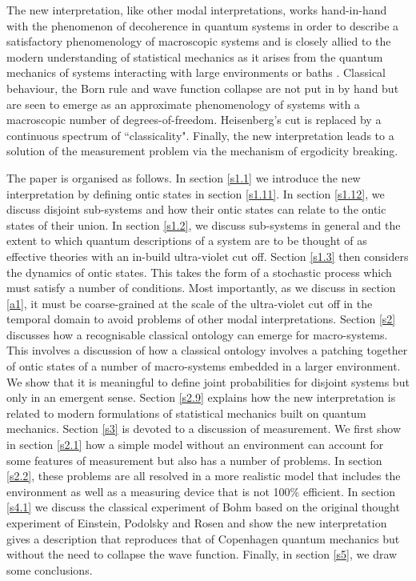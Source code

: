 \documentclass[%
preprint,
nofootinbib,
 amsmath,amssymb,
aps,
]{revtex4-1}
\begin{document}
The new interpretation, like other modal interpretations, works hand-in-hand with the phenomenon of decoherence in quantum systems \cite{Bohm:1951qt,JoosZeh:1985ecptiwe,Joos:2003dacwqt,Zurek:2003dtqc,Schlosshauer:2005dmpiqm,SchlosshauerCamilleri:2008qct,BreuerPetruccione:2002toqs} in order to describe a satisfactory phenomenology of macroscopic systems and is closely allied to the modern understanding of statistical mechanics as it arises from the quantum mechanics of systems interacting with large environments or baths \cite{PopescuShortWinter:2005fsmeisa,PopescuShortWinter:2006efsm,BL,LL,GoldsteinLebowitzTumulkaZanghi:2006ct,GMM,LPSW,Sh}. Classical behaviour, the Born rule and wave function collapse are not put in by hand but are seen to emerge as an approximate phenomenology of systems with a macroscopic number of degrees-of-freedom. Heisenberg's cut is replaced by a continuous spectrum of ``classicality".
Finally, the new interpretation  leads to a solution of the measurement problem via the mechanism of ergodicity breaking.

The paper is organised as follows. In section \ref{s1.1} we introduce the new interpretation by defining ontic states in section \ref{s1.11}. In section \ref{s1.12}, we discuss disjoint sub-systems and how their ontic states can relate to the ontic states of their union. In section \ref{s1.2}, we discuss sub-systems in general and the extent to which quantum descriptions of a system are to be thought of as effective theories with an in-build ultra-violet cut off. Section \ref{s1.3} then considers the dynamics of ontic states. This takes the form of a stochastic process which must satisfy a number of conditions. Most importantly, as we discuss in section \ref{a1}, it must be coarse-grained at the scale of the ultra-violet cut off in the temporal domain to avoid problems of other modal interpretations. Section \ref{s2} discusses how a recognisable classical ontology can emerge for macro-systems. This involves a discussion of how a classical ontology involves a patching together of ontic states of a number of macro-systems embedded in a larger environment. We show that it is meaningful to define joint probabilities for disjoint systems but only in an emergent sense. Section \ref{s2.9} explains how the new interpretation is related to modern formulations of statistical mechanics built on quantum mechanics. Section \ref{s3} is devoted to a discussion of measurement. We first show in section \ref{s2.1} how a simple model without an environment can account for some features of measurement but also has a number of problems. In section \ref{s2.2}, these problems are all resolved in a more realistic model that includes the environment as well as a measuring device that is not 100\% efficient. In section \ref{s4.1} we discuss the classical experiment of Bohm based on the original thought experiment of Einstein, Podolsky and Rosen and show the new interpretation gives a description that reproduces that of Copenhagen quantum mechanics but without the need to collapse the wave function. Finally, in section \ref{s5}, we draw some conclusions.
\end{document}
